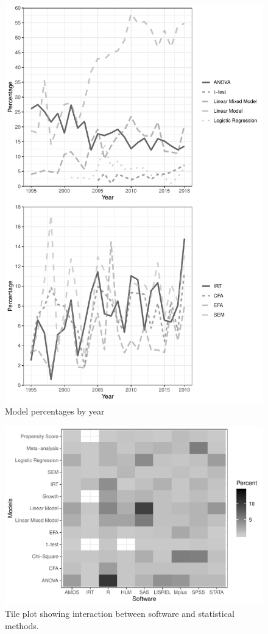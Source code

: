 \documentclass[english,,man]{apa6}
\begin{document}
\begin{figure}
\centering
\includegraphics{software_files/figure-latex/model-year-at1-1.pdf}
\caption{\label{fig:model-year-at1}Model percentages by year}
\end{figure}

\begin{figure}
\centering
\includegraphics{software_files/figure-latex/software-statmethods-1.pdf}
\caption{\label{fig:software-statmethods}Tile plot showing interaction between software and statistical methods.}
\end{figure}
\end{document}
